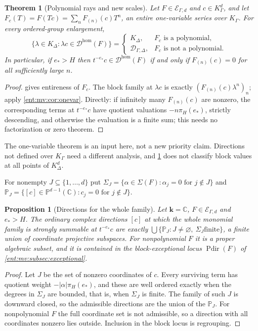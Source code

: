 \documentclass[11pt]{article}
\newtheorem{theorem}{Theorem}[section]
\theoremstyle{plain}
\theoremstyle{plain}
\newtheorem{proposition}[proposition]{Proposition}
\theoremstyle{plain}
\theoremstyle{definition}
\theoremstyle{definition}
\theoremstyle{definition}
\theoremstyle{definition}
\theoremstyle{remark}
\newcommand{\C}{\mathbb C}\newcommand{\R}{\mathbb R}
\newcommand{\K}{K_\Gamma}\newcommand{\KD}{K_\Delta}
\newcommand{\Dom}{\mathcal D_{\Gamma,\Delta}}
\newcommand{\kk}{\mathbf k}\newcommand{\PP}{\mathbb P}
\DeclareMathOperator{\Pdir}{Pdir}\DeclareMathOperator{\Adm}{Adm}
\begin{document}
\begin{theorem}[Polynomial rays and new scales]\label{ent:mv:thm:rays}
Let $F\in\mathcal E_{\Gamma,d}$ and $c\in\K^d$, and let
$F_c(T)=F(Tc)=\sum_nF_{(n)}(c)T^n$, an entire one-variable series over $\K$.
For every ordered-group enlargement,
\[
 \{\lambda\in\KD:\lambda c\in\mathcal D^{\mathrm{hom}}(F)\}
 =\begin{cases}\KD,&F_c\text{ is a polynomial},\\
               \Dom,&F_c\text{ is not a polynomial}.\end{cases}
\]
In particular, if $e_*>H$ then $t^{-e_*}c\in\mathcal D^{\mathrm{hom}}(F)$ if
and only if $F_{(n)}(c)=0$ for all sufficiently large $n$.
\end{theorem}
\begin{proof}
 gives entireness of $F_c$. The block family at
$\lambda c$ is exactly $(F_{(n)}(c)\lambda^n)_n$; apply
\cref{ent:mv:cor:onevar}. Directly: if infinitely many $F_{(n)}(c)$ are
nonzero, the corresponding terms at $t^{-e_*}c$ have quotient valuations
$-n\pi_H(e_*)$, strictly descending, and otherwise the evaluation is a finite
sum; this needs no factorization or zero theorem.
\end{proof}

The one-variable theorem is an input here, not a new priority claim. Directions
not defined over $\K$ need a different analysis, and
\cref{ent:mv:thm:rays} does not classify block values at all points of
$\KD^d$.

For nonempty $J\subseteq\{1,\ldots,d\}$ put
$\Sigma_J=\{\alpha\in\Sigma(F):\alpha_j=0\text{ for }j\notin J\}$ and
$\PP_J=\{[c]\in\PP^{d-1}(\C):c_j=0\text{ for }j\notin J\}$.

\begin{proposition}[Directions for the whole family]\label{ent:mv:prop:coordinate}
Let $\kk=\C$, $F\in\mathcal E_{\Gamma,d}$ and $e_*>H$. The ordinary complex
directions $[c]$ at which the whole monomial family is strongly summable at
$t^{-e_*}c$ are exactly $\bigcup\{\PP_J:J\ne\varnothing,\ \Sigma_J\text{
finite}\}$, a finite union of coordinate projective subspaces. For
nonpolynomial $F$ it is a proper algebraic subset, and it is contained in the
block-exceptional locus $\Pdir(F)$ of \cref{ent:mv:subsec:exceptional}.
\end{proposition}
\begin{proof}
Let $J$ be the set of nonzero coordinates of $c$. Every surviving term has
quotient weight $-|\alpha|\pi_H(e_*)$, and these are well ordered exactly
when the degrees in $\Sigma_J$ are bounded, that is, when $\Sigma_J$ is finite.
The family of such $J$ is downward closed, so the admissible directions are
the union of the $\PP_J$. For nonpolynomial $F$ the full coordinate set is not
admissible, so a direction with all coordinates nonzero lies outside.
Inclusion in the block locus is regrouping.
\end{proof}
\end{document}
